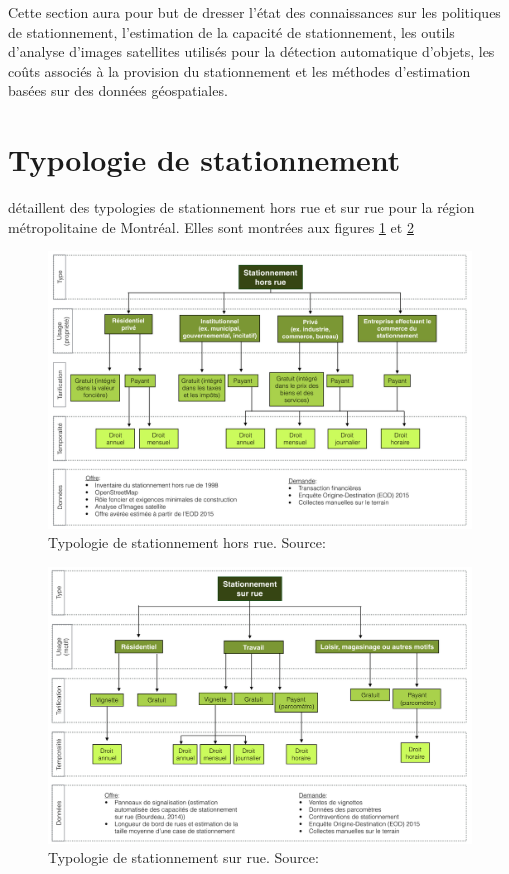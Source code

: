 \label{sec:RevLitt}
Cette section aura pour but de dresser l'état des connaissances sur les politiques de stationnement, l'estimation de la capacité de stationnement, les outils d'analyse d'images satellites utilisés pour la détection automatique d'objets, les coûts associés à la provision du stationnement et les méthodes d'estimation basées sur des données géospatiales.

\section{Typologie de stationnement}\label{sec:typologie_stationnement}
  \textcite{morency_stationnement_2017} détaillent des typologies de stationnement hors rue et sur rue pour la région métropolitaine de Montréal. Elles sont montrées aux figures \ref{fig:Typo_Stat_hors_rue} et \ref{fig:Typo_Stat_sur_rue}
  \begin{figure}[ht]
      \centering
      \includegraphics[width=1.0\textwidth]{dia/Typologie_Stationnement_hors_rue.png}
      \caption{Typologie de stationnement hors rue. Source: \cite{morency_stationnement_2017}}
      \label{fig:Typo_Stat_hors_rue}
  \end{figure}
  \begin{figure}[ht]
      \centering
      \includegraphics[width=1.0\textwidth]{dia/Typologie_Stationnement_sur_rue.png}
      \caption{Typologie de stationnement sur rue. Source: \cite{morency_stationnement_2017}}
      \label{fig:Typo_Stat_sur_rue}
  \end{figure}
